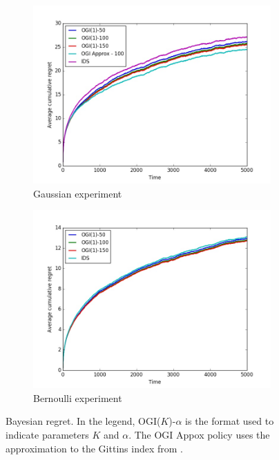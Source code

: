 \begin{figure}[h!]
	\begin{subfigure}{.5\textwidth}
		\centering
		\includegraphics[width=\linewidth]{plots/reduced_gaussian_a.jpg}
		\caption{Gaussian experiment}
		\label{fig:sub1}
	\end{subfigure}
	\begin{subfigure}{.5\textwidth}
		\centering
		\includegraphics[width=\linewidth]{plots/reduced_figure_a.jpg}
		\caption{Bernoulli experiment}
		\label{fig:sub2}
	\end{subfigure}%
	\caption{Bayesian regret. In the legend, OGI($K$)-$\alpha$ is the format used to indicate parameters $K$ and $\alpha$. The OGI Appox policy uses the approximation to the Gittins index from \cite{powell2012optimal}.}
	\label{fig:bayesian_regret}
\end{figure}

